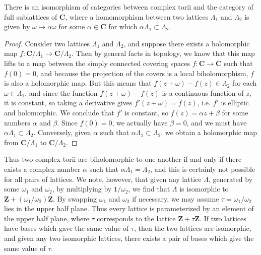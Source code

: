 \begin{theorem}
    There is an isomorphism of categories between complex torii and the category of full sublattices of $\mathbf{C}$, where a homomorphism between two lattices $\Lambda_1$ and $\Lambda_2$ is given by $\omega \mapsto \alpha \omega$ for some $\alpha \in \mathbf{C}$ for which $\alpha \Lambda_1 \subset \Lambda_2$.
\end{theorem}
\begin{proof}
    Consider two lattices $\Lambda_1$ and $\Lambda_2$, and suppose there exists a holomorphic map $f: \mathbf{C}/\Lambda_1 \to \mathbf{C}/\Lambda_2$. Then by general facts in topology, we know that this map lifts to a map between the simply connected covering spaces $f: \mathbf{C} \to \mathbf{C}$ such that $f(0) = 0$, and because the projection of the covers is a local biholomorphism, $f$ is also a holomorphic map. But this means that $f(z + \omega) - f(z) \in \Lambda_2$ for each $\omega \in \Lambda_1$, and since the function $f(z + \omega) - f(z)$ is a continuous function of $z$, it is constant, so taking a derivative gives $f'(z + \omega) = f(z)$, i.e. $f'$ is elliptic and holomorphic. We conclude that $f'$ is constant, so $f(z) = \alpha z + \beta$ for some numbers $\alpha$ and $\beta$. Since $f(0) = 0$, we actually have $\beta = 0$, and we must have $\alpha \Lambda_1 \subset \Lambda_2$. Conversely, given $\alpha$ such that $\alpha \Lambda_1 \subset \Lambda_2$, we obtain a holomorphic map from $\mathbf{C} / \Lambda_1$ to $\mathbf{C} / \Lambda_2$.
\end{proof}

 Thus two complex torii are biholomorphic to one another if and only if there exists a complex number $\alpha$ such that $\alpha \Lambda_1 = \Lambda_2$, and this is certainly not possible for all pairs of lattices. We note, however, that given any lattice $\Lambda$, generated by some $\omega_1$ and $\omega_2$, by multiplying by $1/\omega_2$, we find that $\Lambda$ is isomorphic to $\mathbf{Z} + (\omega_1/\omega_2) \mathbf{Z}$. By swapping $\omega_1$ and $\omega_2$ if necessary, we may assume $\tau = \omega_1/\omega_2$ lies in the upper half plane. Thus every lattice is parameterized by an element of the upper half plane, where $\tau$ corresponds to the lattice $\mathbf{Z} + \tau \mathbf{Z}$. If two lattices have bases which gave the same value of $\tau$, then the two lattices are isomorphic, and given any two isomorphic lattices, there exists a pair of bases which give the same value of $\tau$.

